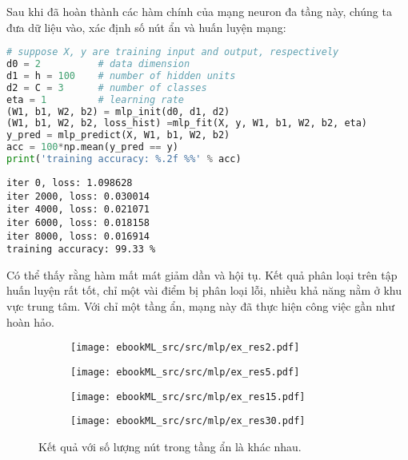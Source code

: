 Sau khi đã hoàn thành các hàm chính của mạng neuron đa tầng này, chúng ta
đưa dữ liệu vào, xác định số nút ẩn và huấn luyện mạng:
\begin{lstlisting}[language=Python]
# suppose X, y are training input and output, respectively 
d0 = 2          # data dimension 
d1 = h = 100    # number of hidden units 
d2 = C = 3      # number of classes 
eta = 1         # learning rate
(W1, b1, W2, b2) = mlp_init(d0, d1, d2)
(W1, b1, W2, b2, loss_hist) =mlp_fit(X, y, W1, b1, W2, b2, eta)
y_pred = mlp_predict(X, W1, b1, W2, b2)
acc = 100*np.mean(y_pred == y)
print('training accuracy: %.2f %%' % acc)
\end{lstlisting}
\kq
\begin{lstlisting}
iter 0, loss: 1.098628
iter 2000, loss: 0.030014
iter 4000, loss: 0.021071
iter 6000, loss: 0.018158
iter 8000, loss: 0.016914
training accuracy: 99.33 %
\end{lstlisting}
Có thể thấy rằng hàm mất mát giảm dần và hội tụ. Kết quả phân loại trên tập
huấn luyện rất tốt, chỉ một vài điểm bị phân loại lỗi, nhiều khả năng nằm
ở khu vực trung tâm. Với chỉ một tầng ẩn, mạng này đã thực hiện công việc
gần như hoàn hảo. 
\begin{figure}[t]
    \begin{subfigure}{0.45\textwidth}
    \texttt{[image: ebookML\_src/src/mlp/ex\_res2.pdf]}
    \caption{}
    \end{subfigure}
    \begin{subfigure}{0.45\textwidth}
    \texttt{[image: ebookML\_src/src/mlp/ex\_res5.pdf]}
    \caption{}
    \end{subfigure}

    \begin{subfigure}{0.45\textwidth}
    \texttt{[image: ebookML\_src/src/mlp/ex\_res15.pdf]}
    \caption{}
    \end{subfigure}
    \begin{subfigure}{0.45\textwidth}
    \texttt{[image: ebookML\_src/src/mlp/ex\_res30.pdf]}
    \caption{}
    \end{subfigure}
    \caption{
     Kết quả với số lượng nút trong tầng ẩn là khác nhau.
    }
    \label{fig:14_10}
\end{figure}

